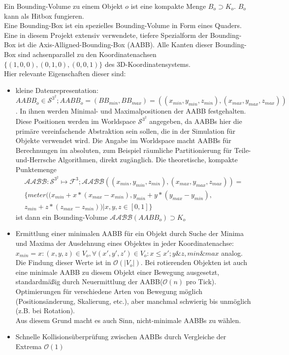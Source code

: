 Ein Bounding-Volume zu einem Objekt $o$ ist eine kompakte Menge $B_o \supset K_{o}$. $B_o$ kann als Hitbox fungieren.\\
Eine Bounding-Box ist ein spezielles Bounding-Volume in Form eines Quaders.\\
Eine in diesem Projekt extensiv verwendete, tiefere Spezialform der Bounding-Box ist die Axis-Alligned-Bounding-Box (AABB). Alle Kanten dieser Bounding-Box sind achsenparallel zu den Koordinatenachsen $\{(1,0,0), (0,1,0), (0,0,1)\}$ des 3D-Koordinatensystems.\\
Hier relevante Eigenschaften dieser sind:
\begin{itemize}
\item kleine Datenrepresentation:
		$$AABB_o \in \mathcal{S}^{3^2}; AABB_o = (BB_{min}, BB_{max}) = ((x_{min}, y_{min}, z_{min}), (x_{max}, y_{max}, z_{max}))$$.
		 In ihnen werden Minimal- und Maximalpositionen der AABB festgehalten.
		 Diese Positionen werden im Worldspace $\mathcal{S}^{3^2}$ angegeben, da AABBs hier die primäre vereinfachende Abstraktion sein sollen, die in der Simulation für Objekte verwendet wird. Die Angabe im Worldspace macht AABBs für Berechnungen im absoluten, zum Beispiel räumliche Partitionierung für Teile-und-Herrsche Algorithmen, direkt zugänglich.
		 Die theoretische, kompakte Punktemenge 
		 \begin{align*}
		 \mathcal{AABB}: \mathcal{S}^{3^2} \mapsto \mathcal{F}^3;
		 \mathcal{AABB} ((x_{min}, y_{min}, z_{min}), (x_{max}, y_{max}, z_{max})) = \\
		 \{meter((x_{min} + x * (x_{max} - x_{min}), y_{min} + y * (y_{max} - y_{min}),\\
		  z_{min} + z * (z_{max} - z_{min}))| x, y, z \in [0,1] \} 
		 \end{align*}
		 ist dann ein Bounding-Volume $\mathcal{AABB}(AABB_o) \supset K_o$
	\item Ermittlung einer minimalen AABB für ein Objekt durch Suche der Minima und Maxima der Ausdehnung eines Objektes in jeder Koordinatenachse:
	 $x_{min} = x : (x, y, z) \in V_o , \forall (x', y', z') \in V_o: x \leq x'; y \& z, min \& max $ analog.
	 Die Findung dieser Werte ist in $ \mathcal{O}(|V_o|) $.
		Bei rotierenden Objekten ist auch eine minimale AABB zu diesem Objekt einer Bewegung ausgesetzt, standardmäßig durch Neuermittlung der AABB($\mathcal{O}(n)$ pro Tick). Optimierungen für verschiedene Arten von Bewegung möglich (Positionsänderung, Skalierung, etc.), aber manchmal schwierig bis unmöglich (z.B. bei Rotation).\\
		Aus diesem Grund macht es auch Sinn, nicht-minimale AABBs zu wählen.
	\item Schnelle Kollisionsüberprüfung zwischen AABBs durch Vergleiche der Extrema $\mathcal{O}(1)$
	
\end{itemize}

